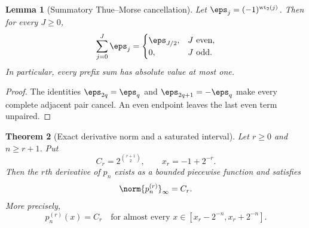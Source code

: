 \documentclass[11pt,oneside]{article}
\newtheorem{theorem}{Theorem}[section]
\newtheorem{lemma}[theorem]{Lemma}
\theoremstyle{definition}
\theoremstyle{remark}
\newcommand{\wt}{\operatorname{wt}_2}
\begin{document}
\begin{lemma}[Summatory Thue--Morse cancellation]
\label{repeated:lem:TM-prefix}
Let $\eps_j=(-1)^{\wt(j)}$.  Then for every $J\ge0$,
\begin{equation}
 \sum_{j=0}^{J}\eps_j=
 \begin{cases}
  \eps_{J/2},&J\text{ even},\\
  0,&J\text{ odd}.
 \end{cases}                                                \label{repeated:eq:TM-prefix}
\end{equation}
In particular, every prefix sum has absolute value at most one.
\end{lemma}

\begin{proof}
The identities $\eps_{2q}=\eps_q$ and $\eps_{2q+1}=-\eps_q$ make every complete adjacent pair
cancel.  An even endpoint leaves the last even term unpaired.
\end{proof}

\begin{theorem}[Exact derivative norm and a saturated interval]
\label{repeated:thm:prefix-plateau}
Let $r\ge0$ and $n\ge r+1$.  Put
\begin{equation}
 C_r=2^{\binom{r+1}{2}},
 \qquad
 x_r=-1+2^{-r}.                                             \label{repeated:eq:Cr-xr}
\end{equation}
Then the $r$th derivative of $p_n$ exists as a bounded piecewise function and satisfies
\begin{equation}
 \norm{p_n^{(r)}}_\infty=C_r.                              \label{repeated:eq:pn-derivative-norm}
\end{equation}
More precisely,
\begin{equation}
 p_n^{(r)}(x)=C_r
 \quad\text{for almost every }x\in[x_r-2^{-n},x_r+2^{-n}]. \label{repeated:eq:pn-plateau}
\end{equation}
\end{theorem}
\end{document}
